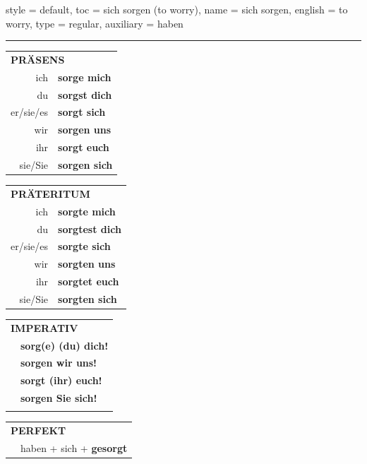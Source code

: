 \begin{verbentry}{
  style = {default},
  toc = {sich sorgen (to worry)},
  name = {sich sorgen},
  english = {to worry},
  type = {regular},
  auxiliary = {haben}
}
 
    
       \vspace{5pt}

    \hrule
    
    \vspace{5pt}

  \begin{tabular}{rl}
     \multicolumn{2}{l}{\textbf{PRÄSENS} }\\
    ich & \textbf{sorge mich}\\
    du & \textbf{sorgst dich}\\
    er/sie/es & \textbf{sorgt sich}\\
    wir & \textbf{sorgen uns}\\
    ihr & \textbf{sorgt euch}\\
    sie/Sie & \textbf{sorgen sich}\\
  \end{tabular}
  \hfill
     \begin{tabular}{rl}
    \multicolumn{2}{l}{\textbf{PRÄTERITUM} }\\
    ich & \textbf{sorgte mich}\\
    du & \textbf{sorgtest dich}\\
    er/sie/es & \textbf{sorgte sich}\\
    wir & \textbf{sorgten uns}\\
    ihr & \textbf{sorgtet euch}\\
    sie/Sie & \textbf{sorgten sich}\\
  \end{tabular}
  \hfill
  \begin{tabular}{rl}
     \multicolumn{2}{l}{\textbf{IMPERATIV} }\\
   & \textbf{sorg(e) (du) dich!}\\
   & \textbf{sorgen wir uns!}\\
   & \textbf{sorgt (ihr) euch!}\\
   & \textbf{sorgen Sie sich!}\\
   & \vspace{10pt}
  \end{tabular}

    \vspace{10pt}

 \begin{tabular}{rl}
     \multicolumn{2}{l}{\textbf{PERFEKT}}\\
    &haben + sich + \textbf{gesorgt}\\
  \end{tabular}
\hfill
   \begin{tabular}{rl}
   

\end{tabular}
\end{verbentry}
